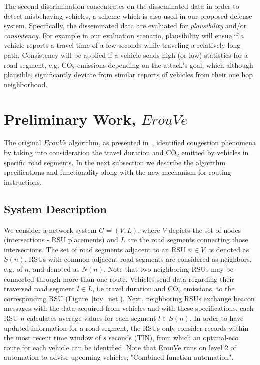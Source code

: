 \documentclass[conference]{IEEEtran}
\begin{document}
The second discrimination concentrates on the disseminated data in order to detect misbehaving vehicles, a scheme which is also used in our proposed defense system. Specifically,
the disseminated data are evaluated for {\it plausibility} and/or {\it consistency}. For example in our evaluation scenario, plausibility will ensue if a vehicle reports
a travel time of a few seconds while traveling a relatively long path. Consistency will be applied if a vehicle sends high (or low) statistics for a road segment, e.g. CO$_2$
emissions depending on the attack's goal, which although plausible, significantly deviate from similar reports of
vehicles from their one hop neighborhood.




\section{Preliminary Work, $ErouVe$}
\label{erouve-pre}

The original $ErouVe$ algorithm, as presented in~\cite{maglaras2013exploiting}, identified congestion phenomena by taking into consideration 
the travel duration and CO$_2$ emitted by vehicles in specific road segments. In the next subsection we describe the algorithm
specifications and functionality along with the new mechanism for routing instructions.


\subsection{System Description}
We consider a network system $G=(V,L)$, where $V$ depicts the set of nodes (intersections - RSU placements) and $L$ are the road segments connecting those intersections. The set of road segments adjacent to an RSU $n\in V$, is denoted as $S(n)$. RSUs with
common adjacent road segments are considered as neighbors, e.g. of $n$, and denoted as $N(n)$. Note that two neighboring RSUs may be connected through
more than one route. Vehicles send data regarding their traversed road segment $l\in L$, i.e travel duration and CO$_2$ emissions, to the corresponding RSU (Figure~\ref{toy_net}). Next, 
neighboring RSUs exchange beacon messages with the data acquired from vehicles and with these specifications, each RSU $n$ calculates average values for each segment 
$l \in S(n)$. In order to have updated information for a road segment, the RSUs only consider records within the most recent time window of $s$ seconds (TIN), from which 
an optimal-eco route for each vehicle can be identified.  
Note that ErouVe runs on level 2 of automation to advise upcoming vehicles;  "Combined function automation".
\end{document}
